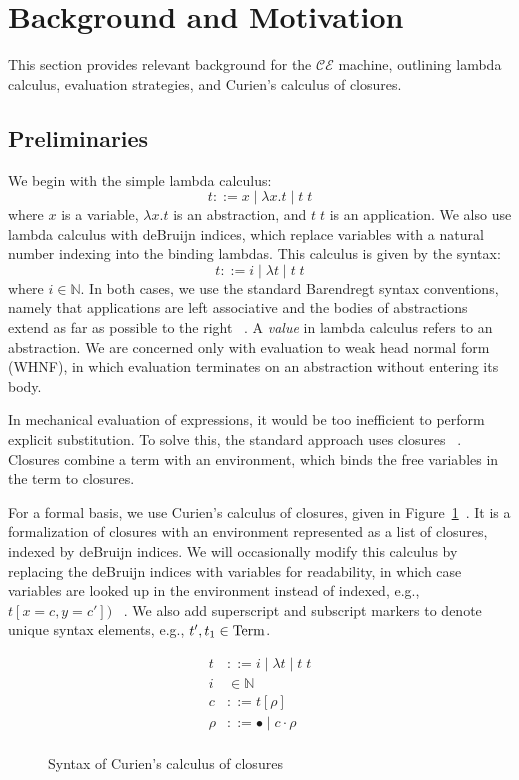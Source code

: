 \section{Background and Motivation} \label{sec:back}

This section provides relevant background for the $\mathcal{CE}$ machine,
outlining lambda calculus, evaluation strategies, and Curien's calculus of
closures.

\subsection{Preliminaries}

We begin with the simple lambda calculus:  $$ t::= x \; | \;  \lambda x.t \; |
\;  t \; t $$ where $x$ is a variable, $\lambda x.t$ is an abstraction, and $t
\; t$ is an application. We also use lambda calculus with deBruijn indices,
which replace variables with a natural number indexing into the binding lambdas.
This calculus is given by the syntax: $$ t::= i \; | \; \lambda t \; | \; t \; t
$$ where $i \in \mathbb{N}$. In both cases, we use the standard Barendregt
syntax conventions, namely that applications are left associative and the bodies
of abstractions extend as far as possible to the right
~\cite{barendregt1984lambda}.  A \emph{value} in lambda calculus refers to an
abstraction. We are concerned only with evaluation to weak head normal form
(WHNF), in which evaluation terminates on an abstraction without entering its
body.

In mechanical evaluation of expressions, it would be too inefficient to perform
explicit substitution. To solve this, the standard approach uses closures
~\cite{landin1964mechanical, curien1991abstract, jonesstg, biernacka2007concrete}.
Closures combine a term with an environment, which binds the free variables in
the term to closures. 

For a formal basis, we use Curien's calculus of closures, given in
Figure~\ref{fig:cursyn}~\cite{curien1991abstract}.  It is a formalization of
closures with an environment represented as a list of closures, indexed by
deBruijn indices. We will occasionally modify this calculus by replacing the
deBruijn indices with variables for readability, in which case variables are
looked up in the environment instead of indexed, e.g., $t[x = c, y = c'])$
~\cite{barendregt1984lambda}. We also add superscript and subscript markers to
denote unique syntax elements, e.g., $t', t_1 \in \textnormal{Term}$. 

\begin{figure}
\begin{align*}
\tag{Term} t &::= i \; | \; \lambda t \; | \; t \; t  \\
\tag{Variable} i &\in \mathbb{N}  \\
\tag{Closure} c &::= t [\rho] \\
\tag{Environment} \rho &::= \bullet \; | \; c \cdot \rho \\
\end{align*}
\caption{Syntax of Curien's calculus of closures}
\label{fig:cursyn}
\end{figure}

